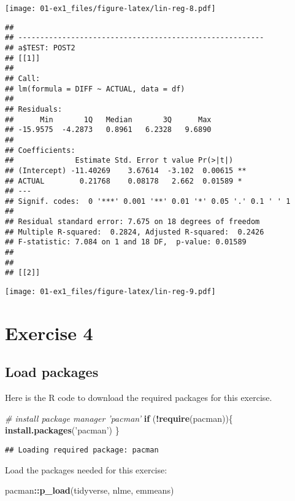 \documentclass[]{book}
\newenvironment{Shaded}{\begin{snugshade}}{\end{snugshade}}
\newcommand{\CommentTok}[1]{\textcolor[rgb]{0.56,0.35,0.01}{\textit{#1}}}
\newcommand{\ControlFlowTok}[1]{\textcolor[rgb]{0.13,0.29,0.53}{\textbf{#1}}}
\newcommand{\KeywordTok}[1]{\textcolor[rgb]{0.13,0.29,0.53}{\textbf{#1}}}
\newcommand{\NormalTok}[1]{#1}
\newcommand{\OperatorTok}[1]{\textcolor[rgb]{0.81,0.36,0.00}{\textbf{#1}}}
\newcommand{\StringTok}[1]{\textcolor[rgb]{0.31,0.60,0.02}{#1}}
\begin{document}
\texttt{[image: 01-ex1\_files/figure-latex/lin-reg-8.pdf]}

\begin{verbatim}
## 
## -------------------------------------------------------- 
## a$TEST: POST2
## [[1]]
## 
## Call:
## lm(formula = DIFF ~ ACTUAL, data = df)
## 
## Residuals:
##      Min       1Q   Median       3Q      Max 
## -15.9575  -4.2873   0.8961   6.2328   9.6890 
## 
## Coefficients:
##              Estimate Std. Error t value Pr(>|t|)   
## (Intercept) -11.40269    3.67614  -3.102  0.00615 **
## ACTUAL        0.21768    0.08178   2.662  0.01589 * 
## ---
## Signif. codes:  0 '***' 0.001 '**' 0.01 '*' 0.05 '.' 0.1 ' ' 1
## 
## Residual standard error: 7.675 on 18 degrees of freedom
## Multiple R-squared:  0.2824, Adjusted R-squared:  0.2426 
## F-statistic: 7.084 on 1 and 18 DF,  p-value: 0.01589
## 
## 
## [[2]]
\end{verbatim}

\texttt{[image: 01-ex1\_files/figure-latex/lin-reg-9.pdf]}

\hypertarget{ex4}{%
\chapter{Exercise 4}\label{ex4}}

\hypertarget{load-packages-1}{%
\section{Load packages}\label{load-packages-1}}

Here is the R code to download the required packages for this exercise.

\begin{Shaded}
\begin{Highlighting}[]
\CommentTok{# install package manager 'pacman'}
\ControlFlowTok{if}\NormalTok{ (}\OperatorTok{!}\KeywordTok{require}\NormalTok{(pacman))\{}
  \KeywordTok{install.packages}\NormalTok{(}\StringTok{'pacman'}\NormalTok{)}
\NormalTok{\}}
\end{Highlighting}
\end{Shaded}

\begin{verbatim}
## Loading required package: pacman
\end{verbatim}

Load the packages needed for this exercise:

\begin{Shaded}
\begin{Highlighting}[]
\NormalTok{pacman}\OperatorTok{::}\KeywordTok{p_load}\NormalTok{(tidyverse, }
\NormalTok{       nlme, }
\NormalTok{       emmeans)}
\end{Highlighting}
\end{Shaded}
\end{document}
